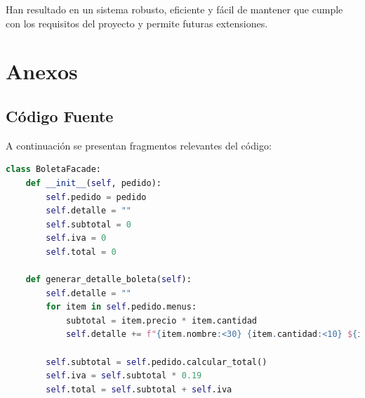 \documentclass[12pt,letterpaper]{article}
\begin{document}
Han resultado en un sistema robusto, eficiente y fácil de mantener que cumple con los requisitos del proyecto y permite futuras extensiones.

\section{Anexos}
\subsection{Código Fuente}
A continuación se presentan fragmentos relevantes del código:

\begin{lstlisting}[language=Python, caption=Implementación de BoletaFacade]
class BoletaFacade:
    def __init__(self, pedido):
        self.pedido = pedido
        self.detalle = ""
        self.subtotal = 0
        self.iva = 0
        self.total = 0

    def generar_detalle_boleta(self):
        self.detalle = ""
        for item in self.pedido.menus:
            subtotal = item.precio * item.cantidad
            self.detalle += f"{item.nombre:<30} {item.cantidad:<10} ${item.precio:<10.2f} ${subtotal:<10.2f}\n"
        
        self.subtotal = self.pedido.calcular_total()
        self.iva = self.subtotal * 0.19
        self.total = self.subtotal + self.iva
\end{lstlisting}
\end{document}
